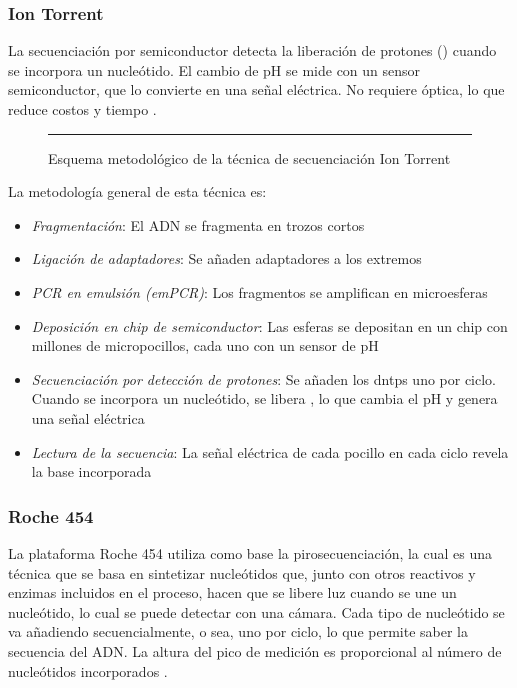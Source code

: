 \documentclass{AsignaturaResumen}
\begin{document}
\FloatBarrier
\subsubsection{Ion Torrent}\label{sec:ion}

La secuenciación por semiconductor detecta la liberación de protones () cuando se incorpora un nucleótido. El cambio de pH se mide con un sensor semiconductor, que lo convierte en una señal eléctrica. No requiere óptica, lo que reduce costos y tiempo \citep{erenDNASequencingMethods2022}.

\begin{figure}\centering
    \resizebox{\linewidth}{!}{}
    \rule{\linewidth}{0.5pt}
    \caption{Esquema metodológico de la técnica de secuenciación Ion Torrent}
    \label{fig:esquema_secuenciacion_g2_ion}
\end{figure}

La metodología general de esta técnica es:

\begin{itemize}
    \item \emph{Fragmentación}: El ADN se fragmenta en trozos cortos
    \item \emph{Ligación de adaptadores}: Se añaden adaptadores a los extremos
    \item \emph{PCR en emulsión (emPCR)}: Los fragmentos se amplifican en microesferas
    \item \emph{Deposición en chip de semiconductor}: Las esferas se depositan en un chip con millones de micropocillos, cada uno con un sensor de pH
    \item \emph{Secuenciación por detección de protones}: Se añaden los \acrshort{dntps} uno por ciclo. Cuando se incorpora un nucleótido, se libera , lo que cambia el pH y genera una señal eléctrica
    \item \emph{Lectura de la secuencia}: La señal eléctrica de cada pocillo en cada ciclo revela la base incorporada
\end{itemize}

    
    
    

\FloatBarrier
\subsubsection{Roche 454}\label{sec:roche_454}

La plataforma Roche 454 utiliza como base la pirosecuenciación, la cual es una técnica que se basa en sintetizar nucleótidos que, junto con otros reactivos y enzimas incluidos en el proceso, hacen que se libere luz cuando se une un nucleótido, lo cual se puede detectar con una cámara. Cada tipo de nucleótido se va añadiendo secuencialmente, o sea, uno por ciclo, lo que permite saber la secuencia del ADN. La altura del pico de medición es proporcional al número de nucleótidos incorporados \citep{erenDNASequencingMethods2022}.
\end{document}
